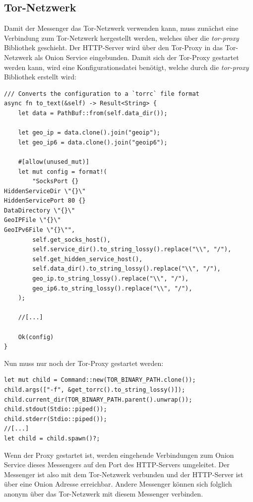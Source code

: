 \documentclass[a4paper,ngerman, headheight=28pt,12pt]{scrartcl}
\begin{document}
\subsection{Tor-Netzwerk}
Damit der Messenger das Tor-Netzwerk verwenden kann, muss zunächst eine Verbindung zum Tor-Netzwerk hergestellt werden, welches über die \textit{tor-proxy} Bibliothek geschieht. Der HTTP-Server wird über den Tor-Proxy in das Tor-Netzwerk als Onion Service eingebunden. Damit sich der Tor-Proxy gestartet werden kann, wird eine Konfigurationsdatei benötigt, welche durch die \textit{tor-proxy} Bibliothek erstellt wird:
\begin{verbatim}
/// Converts the configuration to a `torrc` file format
async fn to_text(&self) -> Result<String> {
    let data = PathBuf::from(self.data_dir());

    let geo_ip = data.clone().join("geoip");
    let geo_ip6 = data.clone().join("geoip6");

    #[allow(unused_mut)]
    let mut config = format!(
        "SocksPort {}
HiddenServiceDir \"{}\"
HiddenServicePort 80 {}
DataDirectory \"{}\"
GeoIPFile \"{}\"
GeoIPv6File \"{}\"",
        self.get_socks_host(),
        self.service_dir().to_string_lossy().replace("\\", "/"),
        self.get_hidden_service_host(),
        self.data_dir().to_string_lossy().replace("\\", "/"),
        geo_ip.to_string_lossy().replace("\\", "/"),
        geo_ip6.to_string_lossy().replace("\\", "/"),
    );

    //[...]

    Ok(config)
}
\end{verbatim}
Nun muss nur noch der Tor-Proxy gestartet werden:
\begin{verbatim}
let mut child = Command::new(TOR_BINARY_PATH.clone());
child.args(["-f", &get_torrc().to_string_lossy()]);
child.current_dir(TOR_BINARY_PATH.parent().unwrap());
child.stdout(Stdio::piped());
child.stderr(Stdio::piped());
//[...]
let child = child.spawn()?;
\end{verbatim}
Wenn der Proxy gestartet ist, werden eingehende Verbindungen zum Onion Service dieses Messengers auf den Port des HTTP-Servers umgeleitet.
Der Messenger ist also mit dem Tor-Netzwerk verbunden und der HTTP-Server ist über eine Onion Adresse erreichbar. Andere Messenger können sich folglich anonym über das Tor-Netzwerk mit diesem Messenger verbinden.
\end{document}
